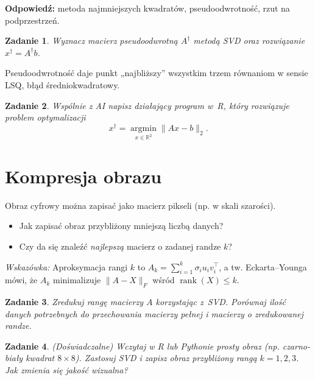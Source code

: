 \documentclass[12pt]{article}
\newtheorem{zadanie}{Zadanie}[section]
\begin{document}
\textbf{Odpowiedź:} metoda najmniejszych kwadratów, pseudoodwrotność, rzut na podprzestrzeń.

\begin{zadanie}
Wyznacz macierz pseudoodwrotną \(A^\dagger\) metodą SVD oraz rozwiązanie 
\(x^\dagger = A^\dagger b\). 
\end{zadanie}

Pseudoodwrotność daje punkt „najbliższy” wszystkim trzem równaniom w sensie LSQ,
błąd średniokwadratowy.

\begin{zadanie}
Wspólnie z AI napisz działający program w~R, który rozwiązuje problem optymalizacji
\[
x^\dagger=\operatorname*{argmin}_{x\in\mathbb{R}^2}\|Ax-b\|_2.
\] 
\end{zadanie}

\medskip

\section{ Kompresja obrazu}
Obraz cyfrowy można zapisać jako macierz pikseli (np. w skali szarości).
\begin{itemize}
  \item Jak zapisać obraz przybliżony mniejszą liczbą danych?
  \item Czy da się znaleźć \emph{najlepszą} macierz o zadanej randze $k$?
\end{itemize}
\textit{Wskazówka:} Aproksymacja rangi $k$ to 
$A_k = \sum_{i=1}^{k} \sigma_i u_i v_i^\top$, 
a tw. Eckarta–Younga mówi, że $A_k$ minimalizuje $\|A - X\|_F$ wśród $\operatorname{rank}(X)\le k$.


\begin{zadanie}
Zredukuj rangę macierzy \(A\) korzystając z~SVD.  
Porównaj ilość danych potrzebnych do przechowania macierzy pełnej i macierzy o zredukowanej randze.
\end{zadanie}

\begin{zadanie}
(Doświadczalne) Wczytaj w R lub Pythonie prosty obraz (np. czarno-biały kwadrat \(8\times 8\)).  
Zastosuj SVD i zapisz obraz przybliżony rangą \(k=1,2,3\).  
Jak zmienia się jakość wizualna?
\end{zadanie}

\medskip
\end{document}
